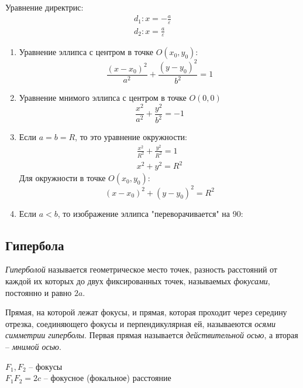 Уравнение директрис:
\begin{gather*}
  d_1: x = -\frac{a}{\varepsilon} \\
  d_2: x = \frac{a}{\varepsilon}
\end{gather*}

\begin{note}
  \begin{center}
    \begin{enumerate}
      \item Уравнение эллипса с центром в точке $O(x_0, y_0)$: \[
        \frac{(x - x_0)^2}{a^2} + \frac{(y - y_0)^2}{b^2} = 1
        \]

      \item Уравнение мнимого эллипса с центром в точке $O(0, 0)$ \[
        \frac{x^2}{a^2} + \frac{y^2}{b^2} = -1
      \]  

      \item Если $a = b = R$, то это уравнение окружности:
        \begin{gather*}
          \frac{x^2}{R^2} + \frac{y^2}{R^2} = 1 \\
          x^2 + y^2 = R^2
        \end{gather*}
        Для окружности в точке $O(x_0, y_0)$: \[
          (x - x_0)^2 + (y - y_0)^2 = R^2
        \]

      \item Если $a < b$, то изображение эллипса "переворачивается" на 90:
  \end{enumerate} 
  \end{center}
\end{note}

\subsection{Гипербола}

\begin{definition}
  \textit{Гиперболой} называется геометрическое место точек, разность расстояний от каждой их которых до двух фиксированных точек, называемых \textit{фокусами}, постоянно и равно $2a$.
\end{definition}

Прямая, на которой лежат фокусы, и прямая, которая проходит через середину отрезка, соединяющего фокусы и перпендикулярная ей, называеются \textit{осями симметрии гиперболы}. 
Первая прямая называется \textit{действительной осью}, а вторая -- \textit{мнимой осью}.

$F_1, F_2$ -- фокусы \\
$F_1F_2 = 2c$ -- фокусное (фокальное) расстояние

